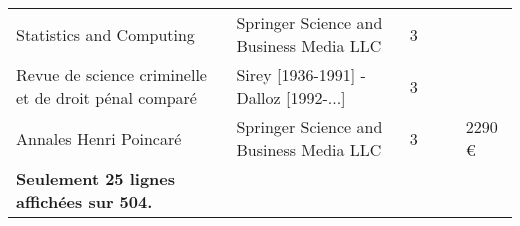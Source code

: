 \begin{longtable}{p{.27\linewidth}P{.18\linewidth}P{.07\linewidth}P{.12\linewidth}P{.12\linewidth}P{.07\linewidth}}
Statistics and Computing & Springer Science and Business Media LLC & 3 &    &    &  \\
Revue de science criminelle et de droit pénal comparé & Sirey [1936-1991] - Dalloz [1992-...] & 3 &    &    &  \\
Annales Henri Poincaré & Springer Science and Business Media LLC & 3 &    &    & 2290 € \\
\textbf{Seulement 25 lignes affichées sur 504.} \\
\bottomrule
\end{longtable}
